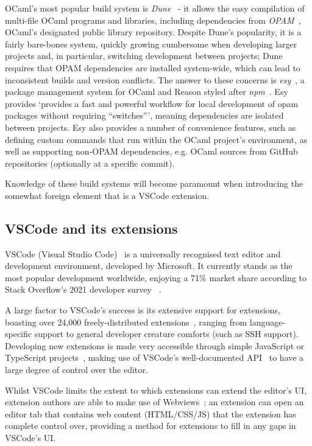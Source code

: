 OCaml's most popular build system is \textit{Dune}~\cite{dune} - it allows the
easy compilation of multi-file OCaml programs and libraries, including
dependencies from \textit{OPAM}~\cite{opam}, OCaml's designated public library
repository. Despite Dune's popularity, it is a fairly bare-bones system, quickly
growing cumbersome when developing larger projects and, in particular,
switching development between projects; Dune requires that OPAM dependencies
are installed system-wide, which can lead to inconsistent builds and version
conflicts. The answer to these concerns is \textit{esy}~\cite{esy}, a package
management system for OCaml and Reason styled after \textit{npm}~\cite{npm}.
Esy provides `provides a fast and powerful workflow for local development of
opam packages without requiring ``switches''', meaning dependencies are isolated
between projects. Esy also provides a number of convenience features, such as
defining custom commands that run within the OCaml project's environment, as
well as supporting non-OPAM dependencies, e.g. OCaml sources from GitHub
repositories (optionally at a specific commit).

Knowledge of these build systems will become paramount when introducing the
somewhat foreign element that is a VSCode extension.


\subsection{VSCode and its extensions}
\label{sec:vscode}

VSCode (Visual Studio Code)~\cite{vscode} is a universally recognised text
editor and development environment, developed by Microsoft. It currently stands
as the most popular development worldwide, enjoying a 71\% market share
according to Stack Overflow's 2021 developer survey
~\cite{stack-overflow-survey-editors}.

A large factor to VSCode's success is its extensive support for extensions,
boasting over 24,000 freely-distributed extensions~\cite{vscode-popularity},
ranging from language-specific support to general developer creature comforts
(such as SSH support). Developing new extensions is made very accessible through
simple JavaScript or TypeScript projects~\cite{vscode-extensions-intro}, making
use of VSCode's well-documented API~\cite{vscode-api} to have a large degree of
control over the editor.

Whilst VSCode limits the extent to which extensions can extend the editor's UI,
extension authors are able to make use of Webviews~\cite{vscode-webview}; an
extension can open an editor tab that contains web content (HTML/CSS/JS) that
the extension has complete control over, providing a method for extensions to
fill in any gaps in VSCode's UI.

